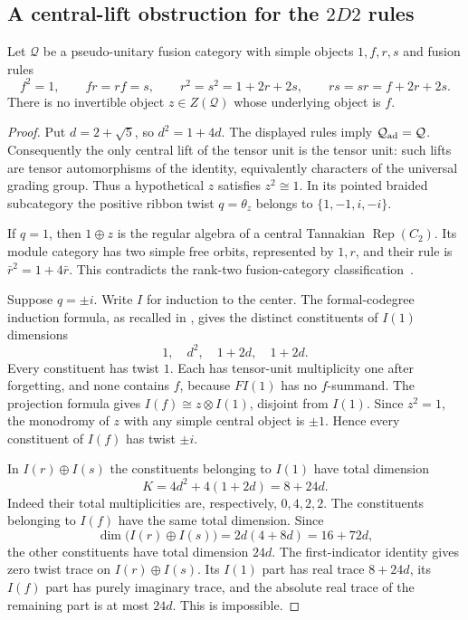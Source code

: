 \subsection{A central-lift obstruction for the \texorpdfstring{$2D2$}{2D2} rules}
\label{subsec:no-central-lift-2d2}
\begin{proposition}
\label{prop:no-central-lift-2d2}
Let $\mathcal Q$ be a pseudo-unitary fusion category with simple objects
$1,f,r,s$ and fusion rules
\[
 f^2=1,\qquad fr=rf=s,\qquad
 r^2=s^2=1+2r+2s,\qquad rs=sr=f+2r+2s.
\]
There is no invertible object $z\in Z(\mathcal Q)$ whose underlying
object is $f$.
\end{proposition}
\begin{proof}
Put $d=2+\sqrt5$, so $d^2=1+4d$. The displayed rules imply
$\mathcal Q_{\rm ad}=\mathcal Q$. Consequently the only central
lift of the tensor unit is the tensor unit: such lifts are tensor
automorphisms of the identity, equivalently characters of the universal
grading group. Thus a hypothetical $z$ satisfies $z^2\cong1$.
In its pointed braided subcategory the positive ribbon twist
$q=\theta_z$ belongs to $\{1,-1,i,-i\}$.

If $q=1$, then $1\oplus z$ is the regular algebra of a central
Tannakian $\operatorname{Rep}(C_2)$. Its module category has two simple
free orbits, represented by $1,r$, and their rule is
$\bar r^2=1+4\bar r$. This contradicts the rank-two fusion-category
classification~\cite{Ostrik2}.

Suppose $q=\pm i$. Write $I$ for induction to the center.
The formal-codegree induction formula, as recalled in
\cite[Appendix~A.2]{EIP}, gives the distinct constituents of $I(1)$
dimensions
\[
 1,\quad d^2,\quad1+2d,\quad1+2d.
\]
Every constituent has twist $1$. Each has tensor-unit multiplicity one
after forgetting, and none contains $f$, because $F I(1)$ has no
$f$-summand. The projection formula gives
$I(f)\cong z\otimes I(1)$, disjoint from $I(1)$.
Since $z^2=1$, the monodromy of $z$ with any simple central object is
$\pm1$. Hence every constituent of $I(f)$ has twist $\pm i$.

In $I(r)\oplus I(s)$ the constituents belonging to $I(1)$ have total
dimension
\[
 K=4d^2+4(1+2d)=8+24d.
\]
Indeed their total multiplicities are, respectively, $0,4,2,2$.
The constituents belonging to $I(f)$ have the same total dimension.
Since
\[
 \dim\bigl(I(r)\oplus I(s)\bigr)
 =2d(4+8d)=16+72d,
\]
the other constituents have total dimension $24d$. The first-indicator
identity gives zero twist trace on $I(r)\oplus I(s)$. Its $I(1)$ part
has real trace $8+24d$, its $I(f)$ part has purely imaginary trace,
and the absolute real trace of the remaining part is at most $24d$.
This is impossible.


\end{proof}

